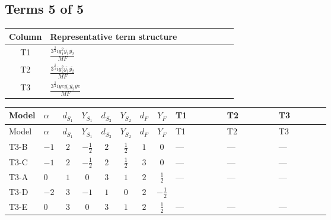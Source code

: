 \documentclass[8pt]{article}
\begin{document}
\begin{landscape}
\subsection*{Terms 5 of 5}
\begin{center}
\begin{tabular}{@{}c >{\raggedright\arraybackslash}p{0.82\linewidth}@{}}
\toprule
Column & Representative term structure \\
\midrule
T1 & \(\displaystyle \frac{3^{\frac{3}{4}} i g_{1}^{2} \overline{y_{1}} \overline{y_{2}}}{MF}\) \\
\midrule
T2 & \(\displaystyle \frac{3^{\frac{3}{4}} i g_{2}^{2} \overline{y_{1}} \overline{y_{2}}}{MF}\) \\
\midrule
T3 & \(\displaystyle \frac{3^{\frac{3}{4}} i ye \overline{y_{1}} \overline{y_{2}} \overline{ye}}{MF}\) \\
\midrule
\bottomrule
\end{tabular}
\end{center}
\smallskip
\tiny
\begin{longtable}{@{}llcccccc >{\raggedright\arraybackslash}p{0.21\linewidth} >{\raggedright\arraybackslash}p{0.21\linewidth} >{\raggedright\arraybackslash}p{0.21\linewidth}@{}}
\toprule
Model & $\alpha$ & $d_{S_1}$ & $Y_{S_1}$ & $d_{S_2}$ & $Y_{S_2}$ & $d_F$ & $Y_F$ & T1 & T2 & T3 \\
\midrule
\endfirsthead
\toprule
Model & $\alpha$ & $d_{S_1}$ & $Y_{S_1}$ & $d_{S_2}$ & $Y_{S_2}$ & $d_F$ & $Y_F$ & T1 & T2 & T3 \\
\midrule
\endhead
T3-B & $-1$ & $2$ & $-\frac{1}{2}$ & $2$ & $\frac{1}{2}$ & $1$ & $0$ & --- & --- & --- \\
\midrule
T3-C & $-1$ & $2$ & $-\frac{1}{2}$ & $2$ & $\frac{1}{2}$ & $3$ & $0$ & --- & --- & --- \\
\midrule
T3-A & $0$ & $1$ & $0$ & $3$ & $1$ & $2$ & $\frac{1}{2}$ & --- & --- & --- \\
\midrule
T3-D & $-2$ & $3$ & $-1$ & $1$ & $0$ & $2$ & $-\frac{1}{2}$ & \scriptsize\adjustbox{max width=\linewidth}{$\begin{gathered} \frac{3^{\frac{3}{4}} i g_{1}^{2} \overline{y_{1}} \overline{y_{2}}}{8 MF}\end{gathered}$} & \scriptsize\adjustbox{max width=\linewidth}{$\begin{gathered} \frac{17 \cdot 3^{\frac{3}{4}} i g_{2}^{2} \overline{y_{1}} \overline{y_{2}}}{24 MF}\end{gathered}$} & \scriptsize\adjustbox{max width=\linewidth}{$\begin{gathered} - \frac{3^{\frac{3}{4}} i ye \overline{y_{1}} \overline{y_{2}} \overline{ye}}{12 MF}\end{gathered}$} \\
\midrule
T3-E & $0$ & $3$ & $0$ & $3$ & $1$ & $2$ & $\frac{1}{2}$ & --- & --- & --- \\
\midrule
\bottomrule
\end{longtable}
\clearpage

\end{landscape}
\end{document}
